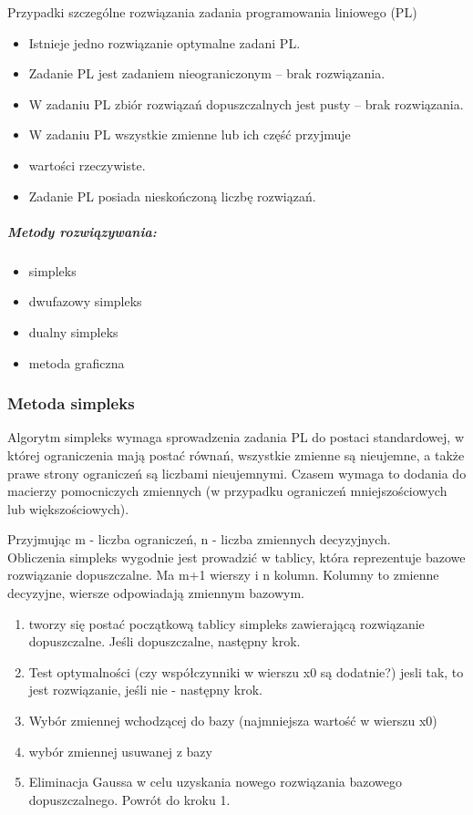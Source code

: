 \documentclass[a4paper,twoside]{report}
\begin{document}
Przypadki szczególne rozwiązania zadania programowania liniowego
(PL)

\begin{itemize}
	\item Istnieje jedno rozwiązanie optymalne zadani PL.
	\item Zadanie PL jest zadaniem nieograniczonym – brak rozwiązania.
	\item W zadaniu PL zbiór rozwiązań dopuszczalnych jest pusty – brak
	rozwiązania.
	\item W zadaniu PL wszystkie zmienne lub ich część przyjmuje
	\item wartości rzeczywiste.
	\item Zadanie PL posiada nieskończoną liczbę rozwiązań.
\end{itemize}

\subparagraph{Metody rozwiązywania:}
\begin{itemize}
	\item simpleks
	\item dwufazowy simpleks
	\item dualny simpleks
	\item metoda graficzna
\end{itemize} 



\subsubsection{Metoda simpleks}  

Algorytm simpleks wymaga sprowadzenia zadania PL do postaci standardowej, w której ograniczenia mają postać równań, wszystkie zmienne są nieujemne, a także prawe strony ograniczeń są liczbami nieujemnymi. Czasem wymaga to dodania do macierzy pomocniczych zmiennych (w przypadku ograniczeń mniejszościowych lub większościowych).


Przyjmując m - liczba ograniczeń, n - liczba zmiennych decyzyjnych. \\
Obliczenia simpleks wygodnie jest prowadzić w tablicy, która reprezentuje bazowe rozwiązanie dopuszczalne. Ma m+1 wierszy i n kolumn. Kolumny to zmienne decyzyjne, wiersze odpowiadają zmiennym bazowym. \\

\begin{enumerate}
	\item  tworzy się postać początkową tablicy simpleks zawierającą rozwiązanie dopuszczalne. Jeśli dopuszczalne, następny krok.
	\item Test optymalności (czy współczynniki w wierszu x0 są dodatnie?) jesli tak, to jest rozwiązanie, jeśli nie - następny krok. 
	\item Wybór zmiennej wchodzącej do bazy (najmniejsza wartość w wierszu x0)
	\item wybór zmiennej usuwanej z bazy
	\item Eliminacja Gaussa w celu uzyskania nowego rozwiązania bazowego dopuszczalnego. Powrót do kroku 1. 
\end{enumerate}
\end{document}
